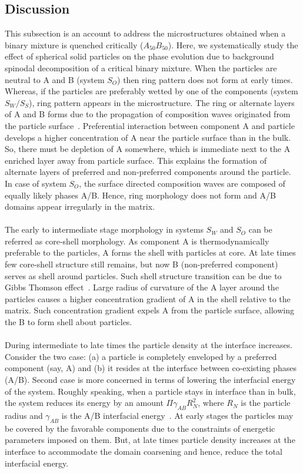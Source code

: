 \documentclass[12pt]{iiscthes}
\theoremstyle{definition}
\theoremstyle{definition}
\theoremstyle{remark}
\begin{document}
\subsection{Discussion}\label{cdiss}
This subsection is an account to address the microstructures obtained when a binary mixture is quenched critically ($A_{50}B_{50}$). Here, we systematically study the effect of spherical solid particles on the phase evolution due to background spinodal decomposition of a critical binary mixture. When the particles are neutral to A and B (system $S_O$) then ring pattern does not form at early times. Whereas, if the particles are preferably wetted by one of the components (system $S_W/S_S$), ring pattern appears in the microstructure. The ring or alternate layers of A and B forms due to the propagation of composition waves originated from the particle surface~\cite{Lee}. Preferential interaction between component A and particle develops a higher concentration of A near the particle surface than in the bulk. So, there must be depletion of A somewhere, which is immediate next to the A enriched layer away from particle surface. This explains the formation of alternate layers of preferred and non-preferred components around the particle. In case of system $S_O$, the surface directed composition waves are composed of equally likely phases A/B. Hence, ring morphology does not form and A/B domains appear irregularly in the matrix. 
\\ \\
The early to intermediate stage morphology in systems $S_W$ and $S_O$ can be referred as core-shell morphology. As component A is thermodynamically preferable to the particles, A forms the shell with particles at core. At late times few core-shell structure still remains, but now B (non-preferred component) serves as shell around particles. Such shell structure transition can be due to Gibbs Thomson effect~\cite{Porter}. Large radius of curvature of the A layer around the particles causes a higher concentration gradient of A in the shell relative to the matrix. Such concentration gradient expels A from the particle surface, allowing the B to form shell about particles.    
\\ \\
During intermediate to late times the particle density at the interface increases. Consider the two case: (a) a particle is completely enveloped by a preferred component (say, A) and (b) it resides at the interface between co-existing phases (A/B). Second case is more concerned in terms of lowering the interfacial energy of the system. Roughly speaking, when a particle stays in interface than in bulk, the system reduces its energy by an amount $\Pi\gamma_{AB}R_N^2$, where $R_N$ is the particle radius and $\gamma_{AB}$ is the A/B interfacial energy~\cite{Hore}. At early stages the particles may be covered by the favorable components due to the constraints of energetic parameters imposed on them. But, at late times particle density increases at the interface to accommodate the domain coarsening and hence, reduce the total interfacial energy.
\end{document}
